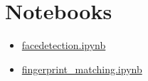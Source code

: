 \section{Notebooks}\label{notebooks}

\begin{itemize}

\item
  \href{https://github.com/cloudmesh/classes/blob/master/docs/source/notebooks/facedetection.ipynb}{facedetection.ipynb}
\item
  \href{https://github.com/cloudmesh/classes/blob/master/docs/source/notebooks/fingerprint_matching.ipynb}{fingerprint\_matching.ipynb}
\end{itemize}
